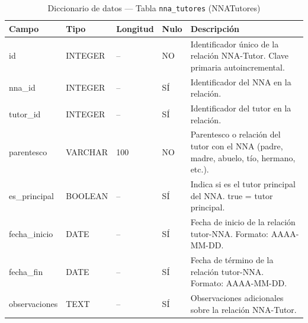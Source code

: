 \begin{table}[H]
	\centering
	\caption{Diccionario de datos --- Tabla \texttt{nna\_tutores} (NNATutores)}
	\label{tab:data-dict-nna_tutores}
	\scriptsize
	\begin{tabular}{>{\ttfamily\raggedright\arraybackslash}p{3.6cm} p{1.6cm} p{1.3cm} p{0.7cm} p{5.6cm}}
		\toprule
		\textbf{Campo} & \textbf{Tipo} & \textbf{Longitud} & \textbf{Nulo} & \textbf{Descripción} \\
		\midrule
		id & INTEGER & -- & NO & Identificador único de la relación NNA-Tutor. Clave primaria autoincremental. \\
		nna\_id & INTEGER & -- & SÍ & Identificador del NNA en la relación. \\
		tutor\_id & INTEGER & -- & SÍ & Identificador del tutor en la relación. \\
		parentesco & VARCHAR & 100 & NO & Parentesco o relación del tutor con el NNA (padre, madre, abuelo, tío, hermano, etc.). \\
		es\_principal & BOOLEAN & -- & SÍ & Indica si es el tutor principal del NNA. true = tutor principal. \\
		fecha\_inicio & DATE & -- & SÍ & Fecha de inicio de la relación tutor-NNA. Formato: AAAA-MM-DD. \\
		fecha\_fin & DATE & -- & SÍ & Fecha de término de la relación tutor-NNA. Formato: AAAA-MM-DD. \\
		observaciones & TEXT & -- & SÍ & Observaciones adicionales sobre la relación NNA-Tutor. \\
		\bottomrule
	\end{tabular}
\end{table}

